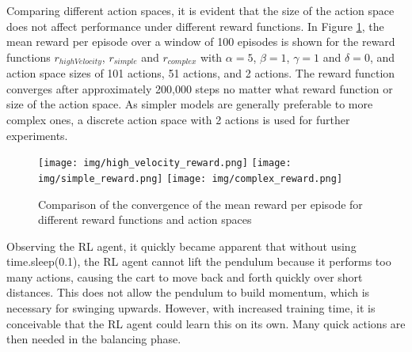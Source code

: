 Comparing different action spaces, it is evident that the size of the action space does not affect performance under different reward functions. In Figure \ref{fig:action_space_comparison}, the mean reward per episode over a window of 100 episodes is shown for the reward functions $r_{highVelocity}$, $r_{simple}$ and $r_{complex}$ with $\alpha=5$, $\beta=1$, $\gamma=1$ and $\delta=0$, and action space sizes of 101 actions, 51 actions, and 2 actions. The reward function converges after approximately 200,000 steps no matter what reward function or size of the action space. As simpler models are generally preferable to more complex ones, a discrete action space with 2 actions is used for further experiments.
\begin{figure}[htbp]
    \centering
    \texttt{[image: img/high\_velocity\_reward.png]}
    \texttt{[image: img/simple\_reward.png]}
    \texttt{[image: img/complex\_reward.png]}
    \caption{Comparison of the convergence of the mean reward per episode for different reward functions and action spaces}
    \label{fig:action_space_comparison}
\end{figure}
Observing the RL agent, it quickly became apparent that without using time.sleep(0.1), the RL agent cannot lift the pendulum because it performs too many actions, causing the cart to move back and forth quickly over short distances. This does not allow the pendulum to build momentum, which is necessary for swinging upwards. However, with increased training time, it is conceivable that the RL agent could learn this on its own. Many quick actions are then needed in the balancing phase.


